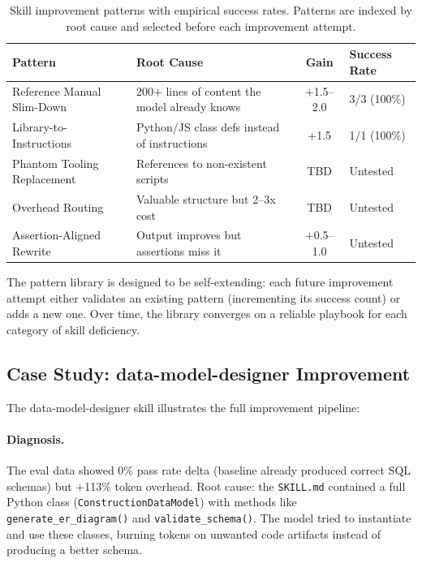 \documentclass[11pt,a4paper]{article}
\begin{document}
\begin{table}[h]
\centering
\caption{Skill improvement patterns with empirical success rates. Patterns are indexed by root cause and selected before each improvement attempt.}
\label{tab:improve-patterns}
\begin{tabular}{p{3.2cm}p{3.8cm}cp{2.2cm}}
\toprule
\textbf{Pattern} & \textbf{Root Cause} & \textbf{Gain} & \textbf{Success Rate} \\
\midrule
Reference Manual Slim-Down & 200+ lines of content the model already knows & +1.5--2.0 & 3/3 (100\%) \\
Library-to-Instructions & Python/JS class defs instead of instructions & +1.5 & 1/1 (100\%) \\
Phantom Tooling Replacement & References to non-existent scripts & TBD & Untested \\
Overhead Routing & Valuable structure but 2--3x cost & TBD & Untested \\
Assertion-Aligned Rewrite & Output improves but assertions miss it & +0.5--1.0 & Untested \\
\bottomrule
\end{tabular}
\end{table}

The pattern library is designed to be self-extending: each future improvement attempt either validates an existing pattern (incrementing its success count) or adds a new one. Over time, the library converges on a reliable playbook for each category of skill deficiency.

\subsection{Case Study: data-model-designer Improvement}

The data-model-designer skill illustrates the full improvement pipeline:

\paragraph{Diagnosis.} The eval data showed 0\% pass rate delta (baseline already produced correct SQL schemas) but +113\% token overhead. Root cause: the \texttt{SKILL.md} contained a full Python class (\texttt{ConstructionDataModel}) with methods like \texttt{generate\_er\_diagram()} and \texttt{validate\_schema()}. The model tried to instantiate and use these classes, burning tokens on unwanted code artifacts instead of producing a better schema.
\end{document}
